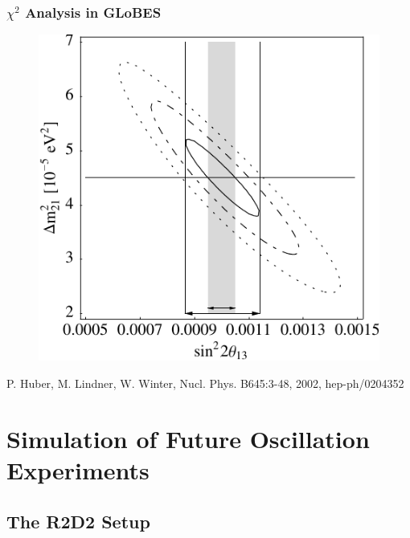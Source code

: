 \documentclass{beamer}
\newcommand{\reference}[1]{\tiny #1 \normalsize}
\begin{document}
\begin{frame}
  \frametitle{$\chi^2$ Analysis in GLoBES}
  
  \begin{figure}
    \includegraphics[width=5 cm]{fig/chi2_2dim.pdf}
  \end{figure}
  \begin{flushright}
    \reference{P. Huber, M. Lindner, W. Winter, Nucl. Phys. B645:3-48, 2002, hep-ph/0204352}
  \end{flushright}
\end{frame}



\section{Simulation of Future Oscillation Experiments}

\subsection{The R2D2 Setup}
\end{document}
